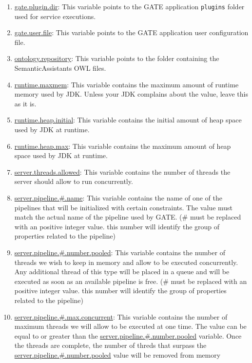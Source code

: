 \begin{enumerate}
\item \url{gate.plugin.dir}: This variable points to the GATE application \texttt{plugins} folder used for service executions.
\item \url{gate.user.file}: This variable points to the GATE application user configuration file.
\item \url{ontology.repository}: This variable points to the folder containing the SemanticAssistants OWL files.
\item \url{runtime.maxmem}: This variable contains the maximum amount of runtime memory used by JDK. Unless your JDK complains about the value, leave this as it is.
\item \url{runtime.heap.initial}: This variable contains the initial amount of heap space used by JDK at runtime.
\item \url{runtime.heap.max}: This variable contains the maximum amount of heap space used by JDK at runtime.
\item \url{server.threads.allowed}: This variable contains the number of threads the server should allow to run concurrently.
\item \url{server.pipeline.\#.name}: This variable contains the name of one of the pipelines that will be initialized with certain constraints.  The value must match the actual name of the pipeline used by GATE. (\# must be replaced with an positive integer value.  this number will identify the group of properties related to the pipeline)
\item \url{server.pipeline.\#.number.pooled}: This variable contains the number of threads we wish to keep in memory and allow to be executed concurrently.  Any additional thread of this type will be placed in a queue and will be executed as soon as an available pipeline is free. (\# must be replaced with an positive integer value.  this number will identify the group of properties related to the pipeline)
\item \url{server.pipeline.\#.max.concurrent}: This variable contains the number of maximum threads we will allow to be executed at one time.  The value can be equal to or greater than the \url{server.pipeline.\#.number.pooled} variable.  Once the threads are complete, the number of threds that surpass the \url{server.pipeline.\#.number.pooled} value will be removed from memory

\end{enumerate}
